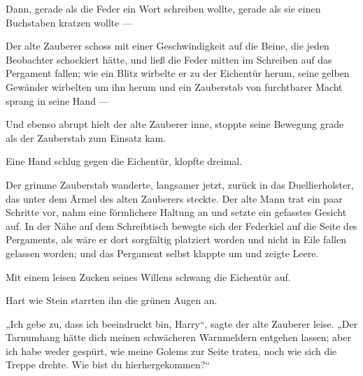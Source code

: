 Dann, gerade als die Feder ein Wort schreiben wollte, gerade als sie einen Buchstaben kratzen wollte —

Der alte Zauberer schoss mit einer Geschwindigkeit auf die Beine, die jeden Beobachter schockiert hätte, und ließ die Feder mitten im Schreiben auf das Pergament fallen; wie ein Blitz wirbelte er zu der Eichentür herum, seine gelben Gewänder wirbelten um ihn herum und ein Zauberstab von furchtbarer Macht sprang in seine Hand —

Und ebenso abrupt hielt der alte Zauberer inne, stoppte seine Bewegung grade als der Zauberstab zum Einsatz kam.

Eine Hand schlug gegen die Eichentür, klopfte dreimal.

Der grimme Zauberstab wanderte, langsamer jetzt, zurück in das Duellierholster, das unter dem Ärmel des alten Zauberers steckte. Der alte Mann trat ein paar Schritte vor, nahm eine förmlichere Haltung an und setzte ein gefasstes Gesicht auf. In der Nähe auf dem Schreibtisch bewegte sich der Federkiel auf die Seite des Pergaments, als wäre er dort sorgfältig platziert worden und nicht in Eile fallen gelassen worden; und das Pergament selbst klappte um und zeigte Leere.

Mit einem leisen Zucken seines Willens schwang die Eichentür auf.

Hart wie Stein starrten ihn die grünen Augen an.

„Ich gebe zu, dass ich beeindruckt bin, Harry“, sagte der alte Zauberer leise.
„Der Tarnumhang hätte dich meinen schwächeren Warnmeldern entgehen lassen; aber ich habe weder gespürt, wie meine Golems zur Seite traten, noch wie sich die Treppe drehte. Wie bist du hierhergekommen?“

